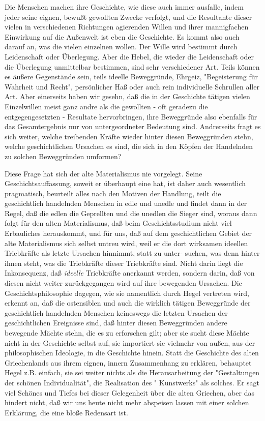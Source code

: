 Die Menschen machen ihre Geschichte, wie diese auch immer
ausfalle, indem jeder seine eignen, bewußt gewollten Zwecke verfolgt,
und die Resultante dieser vielen in verschiedenen Richtungen agierenden
Willen und ihrer mannigfachen Einwirkung auf die Außenwelt ist eben die
Geschichte. Es kommt also auch darauf an, was die vielen einzelnen
wollen. Der Wille wird bestimmt durch Leidenschaft oder Überlegung. Aber
die Hebel, die wieder die Leidenschaft oder die Überlegung unmittelbar
bestimmen, sind sehr verschiedener Art. Teils können es äußere
Gegenstände sein, teils ideelle Beweggründe, Ehrgeiz, "Begeisterung für
Wahrheit und Recht", persönlicher Haß oder auch rein individuelle
Schrullen aller Art. Aber einerseits haben wir gesehn, daß die in der
Geschichte tätigen vielen Einzelwillen meist ganz andre als die
gewollten - oft geradezu die entgegengesetzten - Resultate
hervorbringen, ihre Beweggründe also ebenfalls für das Gesamtergebnis
nur von untergeordneter Bedeutung sind. Andrerseits fragt es sich
weiter, welche treibenden Kräfte wieder hinter diesen Beweggründen
stehn, welche geschichtlichen Ursachen es sind, die sich in den Köpfen
der Handelnden zu solchen Beweggründen umformen?

Diese Frage hat sich der alte Materialismus nie vorgelegt. Seine
Geschichtsauffassung, soweit er überhaupt eine hat, ist daher auch
wesentlich pragmatisch, beurteilt alles nach den Motiven der Handlung,
teilt die geschichtlich handelnden Menschen in edle und unedle und
findet dann in der Regel, daß die edlen die Geprellten und die unedlen
die Sieger sind, woraus dann folgt für den alten Materialismus, daß beim
Geschichtsstudium nicht viel Erbauliches herauskommt, und für uns, daß
auf dem geschichtlichen Gebiet der alte Materialismus sich selbst untreu
wird, weil er die dort wirksamen ideellen Triebkräfte als letzte
Ursachen hinnimmt, statt zu
unter- suchen, was denn hinter
ihnen steht, was die Triebkräfte dieser Triebkräfte sind. Nicht darin
liegt die Inkonsequenz, daß \emph{ideelle} Triebkräfte anerkannt werden,
sondern darin, daß von diesen nicht weiter zurückgegangen wird auf ihre
bewegenden Ursachen. Die Geschichtsphilosophie dagegen, wie sie
namentlich durch Hegel vertreten wird, erkennt an, daß die ostensiblen
und auch die wirklich tätigen Beweggründe der geschichtlich handelnden
Menschen keineswegs die letzten Ursachen der geschichtlichen Ereignisse
sind, daß hinter diesen Beweggründen andere bewegende Mächte stehn, die
es zu erforschen gilt; aber sie sucht diese Mächte nicht in der
Geschichte selbst auf, sie importiert sie vielmehr von außen, aus der
philosophischen Ideologie, in die Geschichte hinein. Statt die
Geschichte des alten Griechenlands aus ihrem eignen, innern Zusammenhang
zu erklären, behauptet Hegel z.B. einfach, sie sei weiter nichts als die
Herausarbeitung der "Gestaltungen der schönen Individualität", die
Realisation des " Kunstwerks" als solches. Er sagt viel Schönes und
Tiefes bei dieser Gelegenheit über die alten Griechen, aber das hindert
nicht, daß wir uns heute nicht mehr abspeisen lassen mit einer solchen
Erklärung, die eine bloße Redensart ist.

